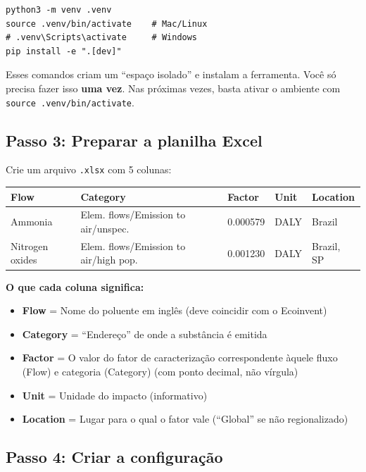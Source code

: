 \begin{lstlisting}[style=bash]
python3 -m venv .venv
source .venv/bin/activate    # Mac/Linux
# .venv\Scripts\activate     # Windows
pip install -e ".[dev]"
\end{lstlisting}

Esses comandos criam um ``espa\c{c}o isolado'' e instalam a ferramenta. Voc\^e s\'o precisa fazer isso \textbf{uma vez}. Nas pr\'oximas vezes, basta ativar o ambiente com \lstinline[style=bash]{source .venv/bin/activate}.

\subsection{Passo 3: Preparar a planilha Excel}

Crie um arquivo \texttt{.xlsx} com 5 colunas:

\begin{table}[H]
\centering
\small
\begin{tabular}{lllll}
\toprule
\textbf{Flow} & \textbf{Category} & \textbf{Factor} & \textbf{Unit} & \textbf{Location} \\
\midrule
Ammonia & Elem. flows/Emission to air/unspec. & 0.000579 & DALY & Brazil \\
Nitrogen oxides & Elem. flows/Emission to air/high pop. & 0.001230 & DALY & Brazil, SP \\
\bottomrule
\end{tabular}
\end{table}

\textbf{O que cada coluna significa:}
\begin{itemize}
    \item \textbf{Flow} = Nome do poluente em ingl\^es (deve coincidir com o Ecoinvent)
    \item \textbf{Category} = ``Endere\c{c}o'' de onde a subst\^ancia \'e emitida
    \item \textbf{Factor} = O valor do fator de caracterização correspondente àquele fluxo (Flow) e categoria (Category) (com ponto decimal, n\~ao v\'irgula)
    \item \textbf{Unit} = Unidade do impacto (informativo)
    \item \textbf{Location} = Lugar para o qual o fator vale (``Global'' se n\~ao regionalizado)
\end{itemize}

\subsection{Passo 4: Criar a configura\c{c}\~ao}

